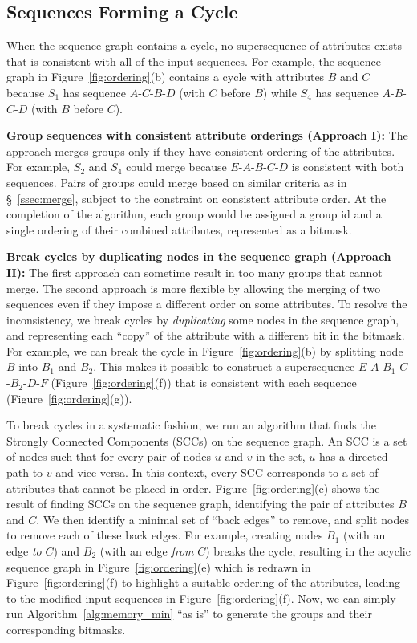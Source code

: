 \subsection{Sequences Forming a Cycle}
When the sequence graph contains a cycle, no supersequence of attributes exists that is consistent with all of the input sequences.  For example, the sequence graph in Figure~\ref{fig:ordering}(b) contains a cycle with attributes $B$ and $C$ because $S_1$ has sequence $A$-$C$-$B$-$D$ (with $C$ before $B$) while $S_4$ has sequence $A$-$B$-$C$-$D$ (with $B$ before $C$).

\textbf{Group sequences with consistent attribute orderings (Approach I):} The approach merges groups only if they have consistent ordering of the attributes.  For example, $S_2$ and $S_4$ could merge because $E$-$A$-$B$-$C$-$D$ is consistent with both sequences.  Pairs of groups could merge based on similar
criteria as in \S~\ref{ssec:merge}, subject to the constraint on consistent attribute order.  At the completion
of the algorithm, each group would be assigned a group id and a single ordering of their combined attributes, represented as a bitmask.

\textbf{Break cycles by duplicating nodes in the sequence graph (Approach II):} The first approach can sometime result in too many groups that cannot merge. The second approach is more flexible by allowing the merging of two sequences even if they impose a different order on some attributes.  To resolve the inconsistency, we break cycles by \emph{duplicating} some nodes in the sequence graph, and representing each ``copy'' of the attribute with a different bit in the bitmask.  For example, we can break the cycle in Figure~\ref{fig:ordering}(b) by splitting node $B$ into $B_1$ and $B_2$.  This makes it possible to construct a supersequence $E$-$A$-$B_1$-$C$-$B_2$-$D$-$F$ (Figure~\ref{fig:ordering}(f)) that is consistent with each sequence (Figure~\ref{fig:ordering}(g)).

To break cycles in a systematic fashion, we run an algorithm that finds the Strongly Connected Components (SCCs) on the sequence graph.  An SCC is a set of nodes such that for every pair of nodes $u$ and $v$ in the set, $u$ has a directed path to $v$ and vice versa. In this context, every SCC corresponds to a set of attributes that cannot be placed in order.  Figure~\ref{fig:ordering}(c) shows the result of finding SCCs on the sequence graph, identifying the pair of attributes $B$ and $C$. We then identify a minimal set of ``back edges'' to remove, and split nodes to remove each of these back edges.  For example, creating nodes $B_1$ (with an edge \emph{to} $C$) and $B_2$ (with an edge \emph{from} $C$) breaks the cycle, resulting in the acyclic sequence graph in Figure~\ref{fig:ordering}(e) which is redrawn in Figure~\ref{fig:ordering}(f) to highlight a suitable ordering of the attributes, leading to the modified input sequences in Figure~\ref{fig:ordering}(f).  Now, we can simply run Algorithm~\ref{alg:memory_min} ``as is'' to generate the groups and their corresponding bitmasks.

